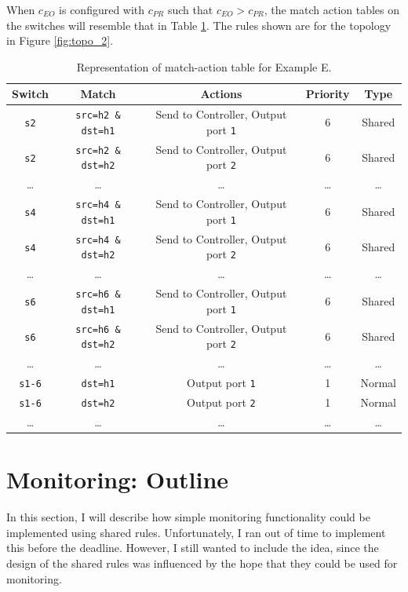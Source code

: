 \documentclass{article}
\begin{document}
When $c_{EO}$ is configured with $c_{PR}$ such that $c_{EO} > c_{PR}$,
the match action tables on the switches will resemble that in
Table \ref{table_E}. 
The rules shown are for the topology in Figure \ref{fig:topo_2}.

\begin{table}
\begin{center}
\begin{tabular}{|c|c|c|c|c|}
\hline
Switch & Match & Actions & Priority & Type \\
\hline
\texttt{s2} & \texttt{src=h2 \& dst=h1} & Send to Controller, Output port \texttt{1} & 6 & Shared \\
\hline
\texttt{s2} & \texttt{src=h2 \& dst=h2} & Send to Controller, Output port \texttt{2} & 6 & Shared \\
\hline
\dots & \dots & \dots & \dots & \dots \\
\hline
\texttt{s4} & \texttt{src=h4 \& dst=h1} & Send to Controller, Output port \texttt{1} & 6 & Shared \\
\hline
\texttt{s4} & \texttt{src=h4 \& dst=h2} & Send to Controller, Output port \texttt{2} & 6 & Shared \\
\hline
\dots & \dots & \dots & \dots & \dots \\
\hline
\texttt{s6} & \texttt{src=h6 \& dst=h1} & Send to Controller, Output port \texttt{1} & 6 & Shared \\
\hline
\texttt{s6} & \texttt{src=h6 \& dst=h2} & Send to Controller, Output port \texttt{2} & 6 & Shared \\
\hline
\dots & \dots & \dots & \dots & \dots \\
\hline
\texttt{s1-6} & \texttt{dst=h1} & Output port \texttt{1} & 1 & Normal \\
\hline
\texttt{s1-6} & \texttt{dst=h2} & Output port \texttt{2} & 1 & Normal\\
\hline
\dots & \dots & \dots & \dots & \dots \\
\hline
\end{tabular}
\end{center}
\caption{Representation of match-action table for Example E.}
\label{table_E}
\end{table}

\section{Monitoring: Outline} \label{MON}

In this section, I will describe how simple monitoring functionality could
be implemented using shared rules. 
Unfortunately, I ran out of time to implement this before the deadline.
However, I still wanted to include the idea, since the design of the shared rules
was influenced by the hope that they could be used for monitoring.
\end{document}
